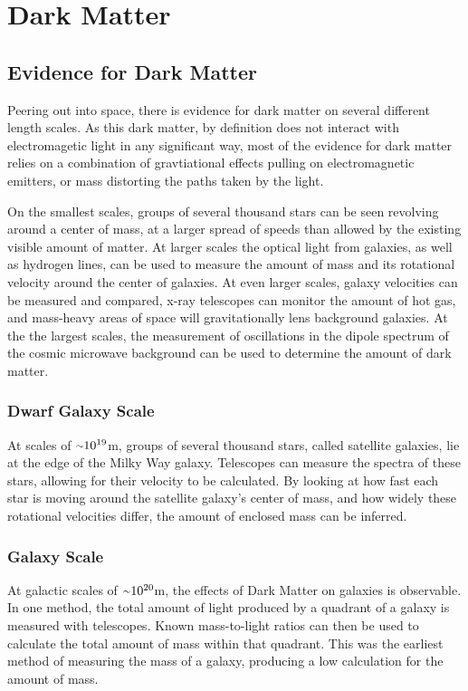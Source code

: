 \cleartooddpage[\thispagestyle{empty}]
\chapter{Dark Matter}

\section{Evidence for Dark Matter}

Peering out into space, there is evidence for dark matter on several different length scales.
As this dark matter, by definition does not interact with electromagetic light in any significant way, most of the evidence for dark matter relies on a combination of gravtiational effects pulling on electromagnetic emitters, or mass distorting the paths taken by the light.

On the smallest scales, groups of several thousand stars can be seen revolving around a center of mass, at a larger spread of speeds than allowed by the existing visible amount of matter.
At larger scales the optical light from galaxies, as well as hydrogen lines, can be used to measure the amount of mass and its rotational velocity around the center of galaxies.
At even larger scales, galaxy velocities can be measured and compared, x-ray telescopes can monitor the amount of hot gas, and mass-heavy areas of space will gravitationally lens background galaxies.
At the the largest scales, the measurement of oscillations in the dipole spectrum of the cosmic microwave background can be used to determine the amount of dark matter.


\subsection{Dwarf Galaxy Scale}
At scales of $\nicetilde 10^{19}$m, groups of several thousand stars, called satellite galaxies, lie at the edge of the Milky Way galaxy.
Telescopes can measure the spectra of these stars, allowing for their velocity to be calculated.
By looking at how fast each star is moving around the satellite galaxy's center of mass, and how widely these rotational velocities differ, the amount of enclosed mass can be inferred.

\subsection{Galaxy Scale}
%
At galactic scales of $\nicetilde 10^{20}$m, the effects of Dark Matter on galaxies is observable.
In one method, the total amount of light produced by a quadrant of a galaxy is measured with telescopes.
Known mass-to-light ratios can then be used to calculate the total amount of mass within that quadrant.
This was the earliest method of measuring the mass of a galaxy, producing a low calculation for the amount of mass.

